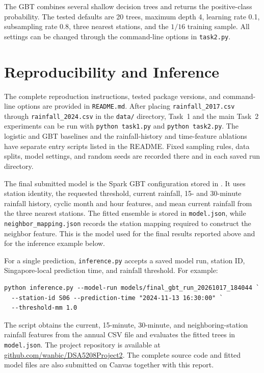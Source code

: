 \documentclass[11pt]{article}
\begin{document}
The GBT combines several shallow decision trees and returns the positive-class
probability. The tested defaults are 20 trees, maximum depth 4, learning rate 0.1,
subsampling rate 0.8, three nearest stations, and the $1/16$ training sample.
All settings can be changed through the command-line options in
\texttt{task2.py}.

\section{Reproducibility and Inference}

The complete reproduction instructions, tested package versions, and command-
line options are provided in \texttt{README.md}. After placing
\texttt{rainfall\_2017.csv} through \texttt{rainfall\_2024.csv} in the
\texttt{data/} directory, Task~1 and the main Task~2 experiments can be run
with \texttt{python task1.py} and \texttt{python task2.py}. The logistic and
GBT baselines and the rainfall-history and time-feature ablations have separate
entry scripts listed in the README. Fixed sampling rules, data splits, model
settings, and random seeds are recorded there and in each saved run directory.

The final submitted model is the Spark GBT configuration stored in
. It uses station identity,
the requested threshold, current rainfall, 15- and 30-minute rainfall history,
cyclic month and hour features, and mean current rainfall from the three
nearest stations. The fitted ensemble is stored in \texttt{model.json}, while
\texttt{neighbor\_mapping.json} records the station mapping required to
construct the neighbor feature. This is the model used for the final results
reported above and for the inference example below.

\begin{samepage}
For a single prediction, \texttt{inference.py} accepts a saved model run,
station ID, Singapore-local prediction time, and rainfall threshold. For
example:

\begin{verbatim}
python inference.py --model-run models/final_gbt_run_20261017_184044 `
  --station-id S06 --prediction-time "2024-11-13 16:30:00" `
  --threshold-mm 1.0
\end{verbatim}
\end{samepage}

The script obtains the current, 15-minute, 30-minute, and neighboring-station
rainfall features from the annual CSV file and evaluates the fitted trees in
\texttt{model.json}. The project repository is available at
\href{https://github.com/wanbic/DSA5208Project2}{github.com/wanbic/DSA5208Project2}.
The complete source code and fitted model files are also submitted on Canvas
together with this report.
\end{document}
